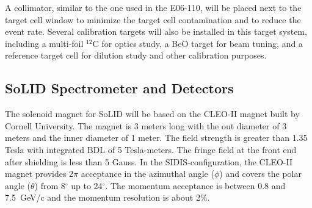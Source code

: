A collimator, similar to the one used in the E06-110, will be placed next to
the target cell window to minimize the target cell contamination and to reduce
the event rate. Several calibration targets will also be installed in this
target system, including a multi-foil $^{12}$C for optics study, a BeO target
for beam tuning, and a reference target cell for dilution study and other
calibration purposes.
  
\subsection {SoLID Spectrometer and Detectors} 

The solenoid magnet for SoLID will be based on the CLEO-II magnet built by
Cornell University. The magnet is 3 meters long with the out diameter of 3
meters and the inner diameter of 1 meter. The field strength is greater than
1.35 Tesla with integrated BDL of 5 Tesla-meters. The fringe field at the front
end after shielding is less than 5 Gauss. In the SIDIS-configuration, the
CLEO-II magnet provides 2$\pi$ acceptance in the azimuthal angle ($\phi$) and
covers the polar angle ($\theta$) from 8$^{\circ}$ up to 24$^{\circ}$. The
momentum acceptance is between 0.8 and 7.5~GeV/c and the momentum resolution is
about 2\%.

